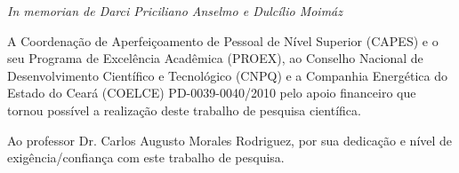\documentclass[12pt,a4paper,tocpage=plain,floatnumber=continuous,chapter=TITLE,appendix=nobox,font=plain, header=ruled,hyperindex=false]{abnt}
\author{Evandro Moimaz Anselmo}
\begin{document}
{}

\capa
\folhaderosto
\pretextualchapter{}
\vfill
\begin{flushright}
\textit{\large In memorian de Darci Priciliano Anselmo e Dulcílio Moimáz}
\end{flushright}


A Coordenação de Aperfeiçoamento de Pessoal de Nível Superior (CAPES) e o seu Programa de Excelência Acadêmica (PROEX), ao Conselho Nacional de Desenvolvimento Científico e Tecnológico (CNPQ) e a Companhia Energética do Estado do Ceará (COELCE) PD-0039-0040/2010 pelo apoio financeiro que tornou possível a realização deste trabalho de pesquisa científica.

Ao professor Dr. Carlos Augusto Morales Rodriguez, por sua dedicação e nível de exigência/confiança com este trabalho de pesquisa. 
\end{document}
